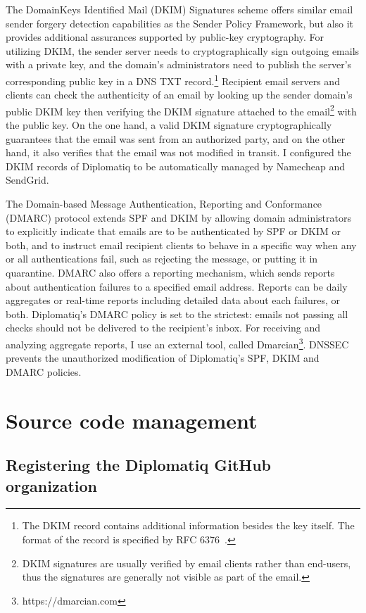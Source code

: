 The DomainKeys Identified Mail (DKIM) Signatures scheme offers similar email sender forgery detection capabilities as the Sender Policy Framework, but also it provides additional assurances supported by public-key cryptography. For utilizing DKIM, the sender server needs to cryptographically sign outgoing emails with a private key, and the domain's administrators need to publish the server's corresponding public key in a DNS TXT record.\footnote{The DKIM record contains additional information besides the key itself. The format of the record is specified by RFC 6376~\cite{rfc6376}.} Recipient email servers and clients can check the authenticity of an email by looking up the sender domain's public DKIM key then verifying the DKIM signature attached to the email\footnote{DKIM signatures are usually verified by email clients rather than end-users, thus the signatures are generally not visible as part of the email.} with the public key. On the one hand, a valid DKIM signature cryptographically guarantees that the email was sent from an authorized party, and on the other hand, it also verifies that the email was not modified in transit. I configured the DKIM records of Diplomatiq to be automatically managed by Namecheap and SendGrid.

The Domain-based Message Authentication, Reporting and Conformance (DMARC) protocol extends SPF and DKIM by allowing domain administrators to explicitly indicate that emails are to be authenticated by SPF or DKIM or both, and to instruct email recipient clients to behave in a specific way when any or all authentications fail, such as rejecting the message, or putting it in quarantine. DMARC also offers a reporting mechanism, which sends reports about authentication failures to a specified email address. Reports can be daily aggregates or real-time  reports including detailed data about each failures, or both. Diplomatiq's DMARC policy is set to the strictest: emails not passing all checks should not be delivered to the recipient's inbox. For receiving and analyzing aggregate reports, I use an external tool, called Dmarcian\footnote{https://dmarcian.com}. DNSSEC prevents the unauthorized modification of Diplomatiq's SPF, DKIM and DMARC policies.

\section{Source code management}

\subsection{Registering the Diplomatiq GitHub organization}

